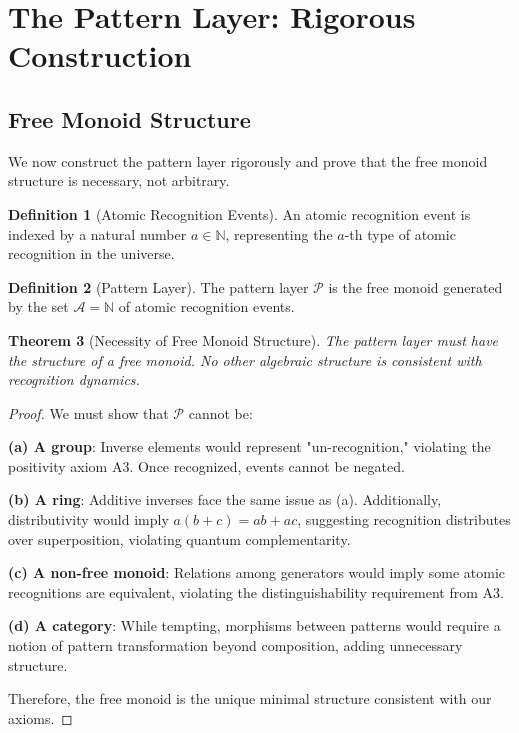 \documentclass[12pt]{article}
\newtheorem{theorem}{Theorem}[section]
\theoremstyle{definition}
\newtheorem{definition}[theorem]{Definition}
\theoremstyle{remark}
\newcommand{\N}{\mathbb{N}}
\newcommand{\Pattern}{\mathcal{P}}
\begin{document}
\section{The Pattern Layer: Rigorous Construction}

\subsection{Free Monoid Structure}

We now construct the pattern layer rigorously and prove that the free monoid structure is necessary, not arbitrary.

\begin{definition}[Atomic Recognition Events]
An atomic recognition event is indexed by a natural number $a \in \N$, representing the $a$-th type of atomic recognition in the universe.
\end{definition}

\begin{definition}[Pattern Layer]
The pattern layer $\Pattern$ is the free monoid generated by the set $\mathcal{A} = \N$ of atomic recognition events.
\end{definition}

\begin{theorem}[Necessity of Free Monoid Structure]
The pattern layer must have the structure of a free monoid. No other algebraic structure is consistent with recognition dynamics.
\end{theorem}

\begin{proof}
We must show that $\Pattern$ cannot be:

\textbf{(a) A group}: Inverse elements would represent "un-recognition," violating the positivity axiom A3. Once recognized, events cannot be negated.

\textbf{(b) A ring}: Additive inverses face the same issue as (a). Additionally, distributivity would imply $a(b+c) = ab + ac$, suggesting recognition distributes over superposition, violating quantum complementarity.

\textbf{(c) A non-free monoid}: Relations among generators would imply some atomic recognitions are equivalent, violating the distinguishability requirement from A3.

\textbf{(d) A category}: While tempting, morphisms between patterns would require a notion of pattern transformation beyond composition, adding unnecessary structure.

Therefore, the free monoid is the unique minimal structure consistent with our axioms.
\end{proof}
\end{document}

